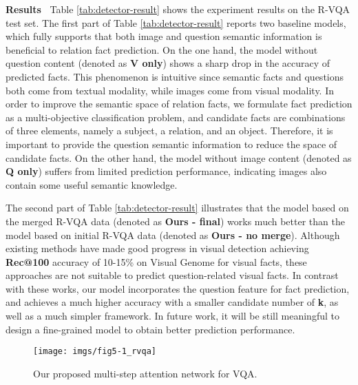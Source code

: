 \documentclass[sigconf]{acmart}
\begin{document}
\textbf{Results~} Table \ref{tab:detector-result} shows the experiment results on the R-VQA test set.
The first part of Table \ref{tab:detector-result} reports two baseline models,
which fully supports that both image and question semantic information is beneficial to relation fact prediction. 
On the one hand, the model without question content (denoted as \textbf{V only}) shows a sharp drop in the accuracy of predicted facts.
This phenomenon is intuitive since semantic facts and questions both come from textual modality, while images come from visual modality.
In order to improve the semantic space of relation facts, we formulate fact prediction as a multi-objective classification problem,
and candidate facts are combinations of three elements, namely a subject, a relation, and an object.
Therefore, it is important to provide the question semantic information to reduce the space of candidate facts. 
On the other hand, the model without image content (denoted as \textbf{Q only}) suffers from limited prediction performance,
indicating images also contain some useful semantic knowledge.

The second part of Table \ref{tab:detector-result} illustrates that the model based on the merged R-VQA data (denoted as \textbf{Ours - final})
works much better than the model  based on initial R-VQA data (denoted as \textbf{Ours - no merge}). 
Although existing methods have made good progress in visual detection achieving \textbf{Rec@100} accuracy of 10-15\% on Visual Genome for visual facts, these approaches are not suitable to predict question-related visual facts.
In contrast with these works, our model incorporates the question feature for fact prediction,
and achieves a much higher accuracy with a smaller candidate number of \textbf{k}, as well as a much simpler framework.
In future work, it will be still meaningful to design a fine-grained model to obtain better prediction performance.



\begin{figure*}[t]
	\centering
	\texttt{[image: imgs/fig5-1\_rvqa]}
	\caption{Our proposed multi-step attention network for VQA.}
	\label{vqamodel}
\end{figure*}
\end{document}
